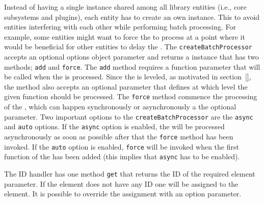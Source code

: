 \documentclass[a4paper,11pt]{kth-mag}
\newcommand{\code}[1]{\texttt{#1}}
\newcommand\abbr[2][]{\uppercase{#2}\ifthenelse{\equal{#1}{}}%
                     {}{#1}}
\begin{document}
        Instead of having a single  instance shared among all library entities (i.e., core subsystems and plugins), each entity has to create an own instance.
        This to avoid entities interfering with each other while performing \gls{batch processing}.
        For example, some entities might want to force the  to process at a point where it would be beneficial for other entities to delay the .
        The \code{createBatchProcessor} accepts an optional options object parameter and returns a  instance that has two methods; \code{add} and \code{force}.
        The \code{add} method requires a function parameter that will be called when the  is processed.
        Since the  is leveled, as motivated in section~\ref{}, the method also accepts an optional parameter that defines at which level the given function should be processed.
        The \code{force} method commence the processing of the , which can happen synchronously or asynchronously a the optional parameter.
        Two important options to the \code{createBatchProcessor} are the \code{async} and \code{auto} options.
        If the \code{async} option is enabled, the  will be processed asynchronously as soon as possible after that the \code{force} method has been invoked.
        If the \code{auto} option is enabled, \code{force} will be invoked when the first function of the  has been added (this implies that \code{async} has to be enabled).

        The \abbr{ID} handler has one method \code{get} that returns the \abbr{ID} of the required element parameter.
        If the element does not have any \abbr{ID} one will be assigned to the element.
        It is possible to override the assignment with an option parameter.


\end{document}
